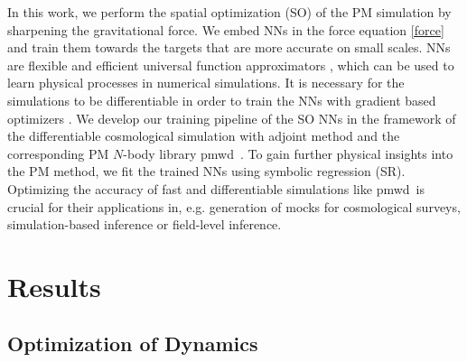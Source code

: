 \documentclass[modern, trackchanges, dvipsnames]{aastex631}
\newcommand{\pmwd}{{\usefont{T1}{nova}{m}{sl}pmwd}}
\begin{document}
In this work, we perform the spatial optimization (SO) of the PM
simulation by sharpening the gravitational force.
We embed NNs in the force equation \eqref{force} and train them towards
the targets that are more accurate on small scales.
NNs are flexible and efficient universal function approximators
\citep{Hornik1989}, which can be used to learn physical processes in
numerical simulations.
It is necessary for the simulations to be differentiable in order to
train the NNs with gradient based optimizers \citep[e.g.][]{Adam}.
We develop our training pipeline of the SO NNs in the framework of
the differentiable cosmological simulation with adjoint method
\citep{Li2022a} and the corresponding PM $N$-body library \pmwd\
\citep{Li2022b}.
To gain further physical insights into the PM method, we fit the trained
NNs using symbolic regression (SR).
Optimizing the accuracy of fast and differentiable simulations like
\pmwd\ is crucial for their applications in, e.g. generation of mocks
for cosmological surveys, simulation-based inference or field-level
inference.



\vspace{1em}
\section{Results}

\subsection{Optimization of Dynamics}
\end{document}
